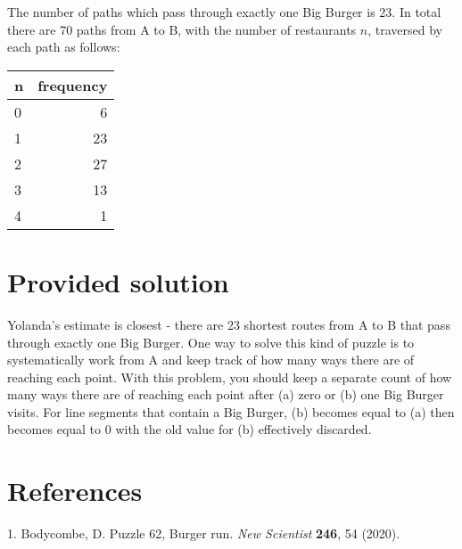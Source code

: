 \documentclass[
]{article}
\begin{document}
The number of paths which pass through exactly one Big Burger is 23. In
total there are 70 paths from A to B, with the number of restaurants
\(n\), traversed by each path as follows:

\begin{longtable}[]{@{}lr@{}}
\toprule
n & frequency\tabularnewline
\midrule
\endhead
0 & 6\tabularnewline
1 & 23\tabularnewline
2 & 27\tabularnewline
3 & 13\tabularnewline
4 & 1\tabularnewline
\bottomrule
\end{longtable}

\hypertarget{provided-solution}{%
\section{Provided solution}\label{provided-solution}}

Yolanda's estimate is closest - there are 23 shortest routes from A to B
that pass through exactly one Big Burger. One way to solve this kind of
puzzle is to systematically work from A and keep track of how many ways
there are of reaching each point. With this problem, you should keep a
separate count of how many ways there are of reaching each point after
(a) zero or (b) one Big Burger visits. For line segments that contain a
Big Burger, (b) becomes equal to (a) then becomes equal to 0 with the
old value for (b) effectively discarded.

\hypertarget{references}{%
\section*{References}\label{references}}

\hypertarget{refs}{}
\leavevmode\hypertarget{ref-bodycombe:2020a}{}%
1. Bodycombe, D. Puzzle 62, Burger run. \emph{New Scientist}
\textbf{246}, 54 (2020).
\end{document}
